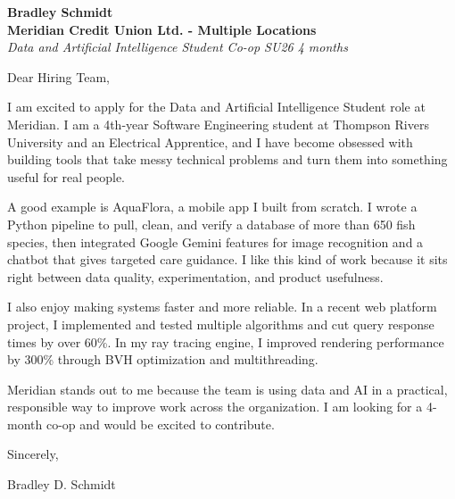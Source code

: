\documentclass[11pt]{article}
\begin{document}
\textbf{Bradley Schmidt}\\
\vspace{0.5em}
\textbf{Meridian Credit Union Ltd. - Multiple Locations}\\
\textit{Data and Artificial Intelligence Student Co-op SU26 4 months}

Dear Hiring Team,

\par

I am excited to apply for the Data and Artificial Intelligence Student role at Meridian. I am a 4th-year Software Engineering student at Thompson Rivers University and an Electrical Apprentice, and I have become obsessed with building tools that take messy technical problems and turn them into something useful for real people.

\par

A good example is AquaFlora, a mobile app I built from scratch. I wrote a Python pipeline to pull, clean, and verify a database of more than 650 fish species, then integrated Google Gemini features for image recognition and a chatbot that gives targeted care guidance. I like this kind of work because it sits right between data quality, experimentation, and product usefulness.

\par

I also enjoy making systems faster and more reliable. In a recent web platform project, I implemented and tested multiple algorithms and cut query response times by over 60\%. In my ray tracing engine, I improved rendering performance by 300\% through BVH optimization and multithreading.

\par

Meridian stands out to me because the team is using data and AI in a practical, responsible way to improve work across the organization. I am looking for a 4-month co-op and would be excited to contribute.

\par

Sincerely,

\par

Bradley D. Schmidt
\end{document}
